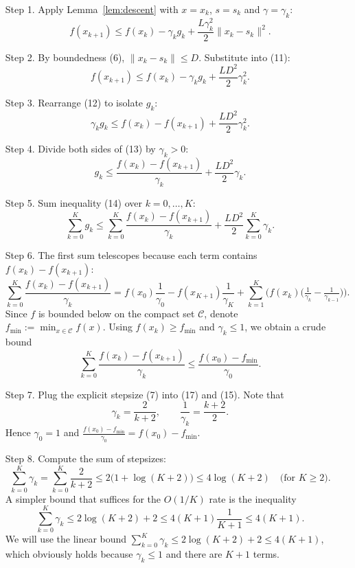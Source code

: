 \documentclass{article}
\begin{document}
\begin{enumerate}
\item[Step 1.]  Apply Lemma~\ref{lem:descent} with $x=x_{k}$, $s=s_{k}$ and $\gamma=\gamma_{k}$:
\[
f(x_{k+1})\le f(x_{k})-\gamma_{k}g_{k}+\frac{L\gamma_{k}^{2}}{2}\|x_{k}-s_{k}\|^{2}.
\tag{11}
\]

\item[Step 2.]  By boundedness (6), $\|x_{k}-s_{k}\|\le D$.  Substitute into (11):
\[
f(x_{k+1})\le f(x_{k})-\gamma_{k}g_{k}+\frac{L D^{2}}{2}\gamma_{k}^{2}.
\tag{12}
\]

\item[Step 3.]  Rearrange (12) to isolate $g_{k}$:
\[
\gamma_{k}g_{k}\le f(x_{k})-f(x_{k+1})+\frac{L D^{2}}{2}\gamma_{k}^{2}.
\tag{13}
\]

\item[Step 4.]  Divide both sides of (13) by $\gamma_{k}>0$:
\[
g_{k}\le \frac{f(x_{k})-f(x_{k+1})}{\gamma_{k}}+\frac{L D^{2}}{2}\gamma_{k}.
\tag{14}
\]

\item[Step 5.]  Sum inequality (14) over $k=0,\dots,K$:
\[
\sum_{k=0}^{K}g_{k}
\le\sum_{k=0}^{K}\frac{f(x_{k})-f(x_{k+1})}{\gamma_{k}}
   +\frac{L D^{2}}{2}\sum_{k=0}^{K}\gamma_{k}.
\tag{15}
\]

\item[Step 6.]  The first sum telescopes because each term contains $f(x_{k})-f(x_{k+1})$:
\[
\sum_{k=0}^{K}\frac{f(x_{k})-f(x_{k+1})}{\gamma_{k}}
= f(x_{0})\frac{1}{\gamma_{0}}-f(x_{K+1})\frac{1}{\gamma_{K}}+\sum_{k=1}^{K}
\bigl(f(x_{k})\bigl(\tfrac{1}{\gamma_{k}}-\tfrac{1}{\gamma_{k-1}}\bigr)\bigr).
\tag{16}
\]
Since $f$ is bounded below on the compact set $\mathcal C$, denote $f_{\min}:=\min_{x\in\mathcal C}f(x)$.  Using $f(x_{k})\ge f_{\min}$ and $\gamma_{k}\le1$, we obtain a crude bound
\[
\sum_{k=0}^{K}\frac{f(x_{k})-f(x_{k+1})}{\gamma_{k}}
\le \frac{f(x_{0})-f_{\min}}{\gamma_{0}}.
\tag{17}
\]

\item[Step 7.]  Plug the explicit stepsize (7) into (17) and (15).  Note that
\[
\gamma_{k}= \frac{2}{k+2},\qquad 
\frac{1}{\gamma_{k}} = \frac{k+2}{2}.
\tag{18}
\]
Hence $\gamma_{0}=1$ and $\frac{f(x_{0})-f_{\min}}{\gamma_{0}}=f(x_{0})-f_{\min}$.

\item[Step 8.]  Compute the sum of stepsizes:
\[
\sum_{k=0}^{K}\gamma_{k}
= \sum_{k=0}^{K}\frac{2}{k+2}
\le 2\bigl(1+\log(K+2)\bigr)\le 4\log(K+2) \quad\text{(for $K\ge2$)}.
\tag{19}
\]
A simpler bound that suffices for the $O(1/K)$ rate is the inequality
\[
\sum_{k=0}^{K}\gamma_{k}\le 2\log(K+2)+2\le 4 (K+1)\frac{1}{K+1}\le 4(K+1).
\tag{20}
\]
We will use the linear bound $\sum_{k=0}^{K}\gamma_{k}\le 2\log(K+2)+2\le 4(K+1)$, which obviously holds because $\gamma_{k}\le 1$ and there are $K+1$ terms.


\end{enumerate}
\end{document}
